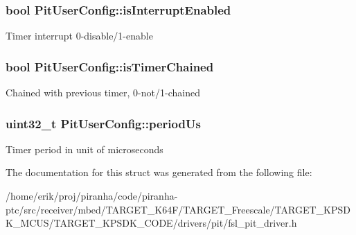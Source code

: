 \subsubsection[{\texorpdfstring{is\+Interrupt\+Enabled}{isInterruptEnabled}}]{\setlength{\rightskip}{0pt plus 5cm}bool Pit\+User\+Config\+::is\+Interrupt\+Enabled}\hypertarget{structPitUserConfig_a4b622c315927ac9071df740fab8a6d46}{}\label{structPitUserConfig_a4b622c315927ac9071df740fab8a6d46}
Timer interrupt 0-\/disable/1-\/enable 
\subsubsection[{\texorpdfstring{is\+Timer\+Chained}{isTimerChained}}]{\setlength{\rightskip}{0pt plus 5cm}bool Pit\+User\+Config\+::is\+Timer\+Chained}\hypertarget{structPitUserConfig_ae84953c67b205efb2b1f1a3a66e1f2bb}{}\label{structPitUserConfig_ae84953c67b205efb2b1f1a3a66e1f2bb}
Chained with previous timer, 0-\/not/1-\/chained 
\subsubsection[{\texorpdfstring{period\+Us}{periodUs}}]{\setlength{\rightskip}{0pt plus 5cm}uint32\+\_\+t Pit\+User\+Config\+::period\+Us}\hypertarget{structPitUserConfig_a9a6acd9170268f69e71a6e3822ddda61}{}\label{structPitUserConfig_a9a6acd9170268f69e71a6e3822ddda61}
Timer period in unit of microseconds 

The documentation for this struct was generated from the following file\+:\begin{DoxyCompactItemize}
\item 
/home/erik/proj/piranha/code/piranha-\/ptc/src/receiver/mbed/\+T\+A\+R\+G\+E\+T\+\_\+\+K64\+F/\+T\+A\+R\+G\+E\+T\+\_\+\+Freescale/\+T\+A\+R\+G\+E\+T\+\_\+\+K\+P\+S\+D\+K\+\_\+\+M\+C\+U\+S/\+T\+A\+R\+G\+E\+T\+\_\+\+K\+P\+S\+D\+K\+\_\+\+C\+O\+D\+E/drivers/pit/fsl\+\_\+pit\+\_\+driver.\+h\end{DoxyCompactItemize}
